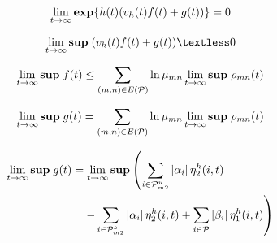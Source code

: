 \documentclass[twocolumn]{autart}    %
\begin{document}
\begin{pf}
    \begin{equation}
        \begin{aligned}
            \setlength{\arraycolsep}{0.9pt}
            \lim_{t \rightarrow \infty}\bold{exp}\{h(t)(v_{h}(t)f(t)+g(t)) \} = 0
        \end{aligned}
    \end{equation}
    
    \begin{equation}
        \begin{aligned}
            \setlength{\arraycolsep}{0.9pt}
            \lim_{t \rightarrow \infty} \bold{sup}\;(v_{h}(t)f(t)+g(t)) \textless 0
        \end{aligned}
    \end{equation}
    
    \begin{equation}
        \begin{aligned}
            \setlength{\arraycolsep}{0.9pt}
            \lim_{t \rightarrow \infty}\bold{sup}\;f(t) \le \sum_{(m,n) \in E(\mathcal{P})} \ln\mu_{mn}\lim_{t \rightarrow \infty}\bold{sup}\;\rho_{mn}(t)
        \end{aligned}
    \end{equation}
    
    \begin{equation}
        \begin{aligned}
            \setlength{\arraycolsep}{0.9pt}
            \lim_{t \rightarrow \infty}\bold{sup}\;g(t) = \sum_{(m,n) \in E(\mathcal{P})} \ln\mu_{mn}\lim_{t \rightarrow \infty}\bold{sup}\;\rho_{mn}(t)
        \end{aligned}
    \end{equation}
    
    
    \begin{equation}
        \begin{aligned}
            \setlength{\arraycolsep}{0.9pt}
            \lim_{t \rightarrow \infty}\bold{sup}\;g(t)&=\lim_{t \rightarrow \infty}\bold{sup}\left(\sum_{i \in \mathcal{P}_{m2}^{u}}\left|\alpha_{i}\right|\eta_{2}^{h}(i,t)\right.\\
            & \left.\quad-\sum_{i \in \mathcal{P}_{m2}^{s}}\left|\alpha_{i}\right|\eta_{2}^{h}(i,t)+\sum_{i \in \mathcal{P}}\left|\beta_{i}\right|\eta_{1}^{h}(i,t)\right)
        \end{aligned}
    \end{equation}
    

\end{pf}
\end{document}
